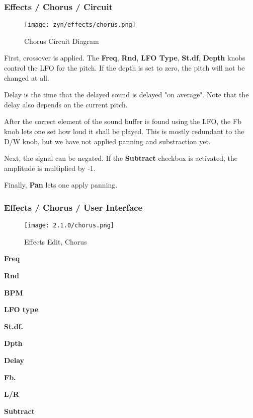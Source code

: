 \subsubsection{Effects / Chorus / Circuit}
\label{subsubsec:effects_edit_chorus_circuit}

\begin{figure}[H]
   \centering
   \texttt{[image: zyn/effects/chorus.png]}
   \caption{Chorus Circuit Diagram}
   \label{fig:chorus_circuit_diagram}
\end{figure}

   First, crossover is applied.
   The \textbf{Freq}, \textbf{Rnd}, \textbf{LFO Type}, \textbf{St.df},
   \textbf{Depth} knobs control the LFO
   for the pitch. If the depth is set to zero, the pitch will not be changed
   at all.

   Delay is the time that the delayed sound is delayed "on average". Note
   that the delay also depends on the current pitch.

   After the correct element of the sound buffer is found using the LFO, the
   Fb knob lets one set how loud it shall be played. This is mostly redundant
   to the D/W knob, but we have not applied panning and substraction yet.

   Next, the signal can be negated. If the \textbf{Subtract}
   checkbox is activated, the amplitude is multiplied by -1.

   Finally, \textbf{Pan} lets one apply panning.

\subsubsection{Effects / Chorus / User Interface}
\label{subsubsec:effects_edit_chorus_ui}

\begin{figure}[H]
   \centering
   \texttt{[image: 2.1.0/chorus.png]}
   \caption{Effects Edit, Chorus}
   \label{fig:effects_edit_chorus}
\end{figure}

   \begin{enumber}
      \item \textbf{Freq}
      \item \textbf{Rnd}
      \item \textbf{BPM}
      \item \textbf{LFO type}
      \item \textbf{St.df.}
      \item \textbf{Dpth}
      \item \textbf{Delay}
      \item \textbf{Fb.}
      \item \textbf{L/R}
      \item \textbf{Subtract}
   \end{enumber}

